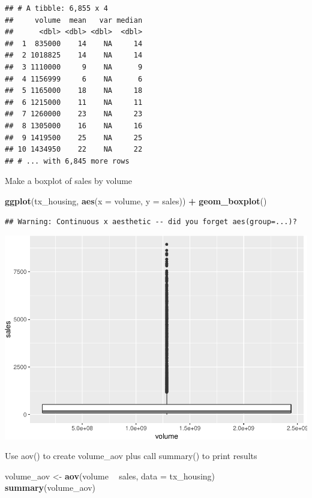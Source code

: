 \documentclass[]{book}
\newenvironment{Shaded}{\begin{snugshade}}{\end{snugshade}}
\newcommand{\DataTypeTok}[1]{\textcolor[rgb]{0.13,0.29,0.53}{#1}}
\newcommand{\KeywordTok}[1]{\textcolor[rgb]{0.13,0.29,0.53}{\textbf{#1}}}
\newcommand{\NormalTok}[1]{#1}
\newcommand{\OperatorTok}[1]{\textcolor[rgb]{0.81,0.36,0.00}{\textbf{#1}}}
\newcommand{\StringTok}[1]{\textcolor[rgb]{0.31,0.60,0.02}{#1}}
\begin{document}
\begin{verbatim}
## # A tibble: 6,855 x 4
##     volume  mean   var median
##      <dbl> <dbl> <dbl>  <dbl>
##  1  835000    14    NA     14
##  2 1018825    14    NA     14
##  3 1110000     9    NA      9
##  4 1156999     6    NA      6
##  5 1165000    18    NA     18
##  6 1215000    11    NA     11
##  7 1260000    23    NA     23
##  8 1305000    16    NA     16
##  9 1419500    25    NA     25
## 10 1434950    22    NA     22
## # ... with 6,845 more rows
\end{verbatim}

Make a boxplot of sales by volume

\begin{Shaded}
\begin{Highlighting}[]
\KeywordTok{ggplot}\NormalTok{(tx_housing, }\KeywordTok{aes}\NormalTok{(}\DataTypeTok{x =}\NormalTok{ volume, }\DataTypeTok{y =}\NormalTok{ sales)) }\OperatorTok{+}\StringTok{ }
\StringTok{  }\KeywordTok{geom_boxplot}\NormalTok{()}
\end{Highlighting}
\end{Shaded}

\begin{verbatim}
## Warning: Continuous x aesthetic -- did you forget aes(group=...)?
\end{verbatim}

\includegraphics{code4stem_files/figure-latex/box plot of sales a/b test-1.pdf}

Use aov() to create volume\_aov plus call summary() to print results

\begin{Shaded}
\begin{Highlighting}[]
\NormalTok{volume_aov <-}\StringTok{ }\KeywordTok{aov}\NormalTok{(volume }\OperatorTok{~}\StringTok{ }\NormalTok{sales, }\DataTypeTok{data =}\NormalTok{ tx_housing)}
\KeywordTok{summary}\NormalTok{(volume_aov)}
\end{Highlighting}
\end{Shaded}
\end{document}
